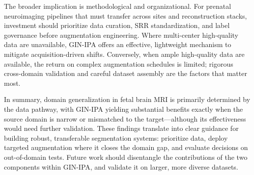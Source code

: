 The broader implication is methodological and organizational. For prenatal neuroimaging pipelines that must transfer across sites and reconstruction stacks, investment should prioritize data curation, SRR standardization, and label governance before augmentation engineering. Where multi-center high-quality data are unavailable, GIN-IPA offers an effective, lightweight mechanism to mitigate acquisition-driven shifts. Conversely, when ample high-quality data are available, the return on complex augmentation schedules is limited; rigorous cross-domain validation and careful dataset assembly are the factors that matter most.

In summary, domain generalization in fetal brain MRI is primarily determined by the data pathway, with GIN-IPA yielding substantial benefits exactly when the source domain is narrow or mismatched to the target---although its effectiveness would need further validation. These findings translate into clear guidance for building robust, transferable segmentation systems: prioritize data, deploy targeted augmentation where it closes the domain gap, and evaluate decisions on out-of-domain tests. Future work should disentangle the contributions of the two components within GIN-IPA, and validate it on larger, more diverse datasets.

